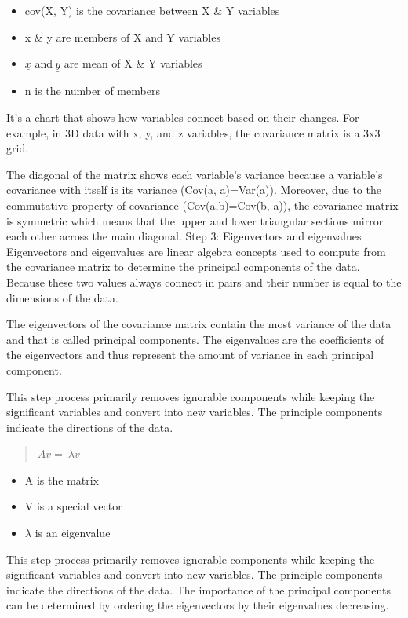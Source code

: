 \begin{itemize}
    \item cov(X, Y) is the covariance between X \& Y variables
    \item x \& y are members of X and Y variables
    \item \(\underline{x}\) and\(\ \underline{y}\) are mean of X \& Y variables
    \item n is the number of members 
\end{itemize}

It’s a chart that shows how variables connect based on their changes. For example, in 3D data with x, y, and z variables, the covariance matrix is a 3x3 grid. 
                    
The diagonal of the matrix shows each variable’s variance because a variable’s covariance with itself is its variance (Cov(a, a)=Var(a)). Moreover, due to the commutative property of covariance (Cov(a,b)=Cov(b, a)), the covariance matrix is symmetric which means that the upper and lower triangular sections mirror each other across the main diagonal.
Step 3: Eigenvectors and eigenvalues
Eigenvectors and eigenvalues are linear algebra concepts used to compute from the covariance matrix to determine the principal components of the data. Because these two values always connect in pairs and their number is equal to the dimensions of the data. 

The eigenvectors of the covariance matrix contain the most variance of the data and that is called principal components. The eigenvalues are the coefficients of the eigenvectors and thus represent the amount of variance in each principal component.

This step process primarily removes ignorable components while keeping the significant variables and convert into new variables. The principle components indicate the directions of the data.
\begin{quote}
    
    \(Av = \ \lambda v\)
\end{quote}
\begin{itemize}
    \item A is the matrix
    \item V is a special vector
    \item \(\lambda \) is an eigenvalue
\end{itemize}

This step process primarily removes ignorable components while keeping the significant variables and convert into new variables. The principle components indicate the directions of the data.
The importance of the principal components can be determined by ordering the eigenvectors by their eigenvalues decreasing.

